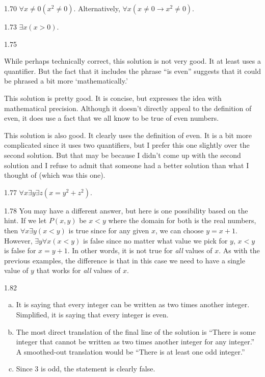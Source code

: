 \begin{Answer}{1.70}
$\forall x\neq 0 (x^2\neq 0)$.
Alternatively, $\forall x (x\neq 0 \rightarrow x^2\neq 0)$.
\end{Answer}
\begin{Answer}{1.73}
$\exists x (x>0)$.
\end{Answer}
\begin{Answer}{1.75}
\begin{solevalenum}
\item
While perhaps technically correct, this solution is not very good.  It at least uses a quantifier.
But the fact that it includes the phrase ``is even'' suggests that it could be phrased a bit more `mathematically.'
\item
This solution is pretty good.  It is concise, but expresses the idea with mathematical precision.
Although it doesn't directly appeal to the definition of even, it does use a fact that we all know to be
true of even numbers.
\item
This solution is also good.  It clearly uses the definition of even. It is a bit more complicated
since it uses two quantifiers, but I prefer this one slightly over the second solution.
But that may be because I didn't come up with the second solution and I refuse to admit that
someone had a better solution than what I thought of (which was this one).
\end{solevalenum}
\end{Answer}
\begin{Answer}{1.77}
$\forall x\exists y \exists z (x=y^2+z^2)$.
\end{Answer}
\begin{Answer}{1.78}
You may have a different answer, but here is one possibility based on the hint.
If we let $P(x,y)$ be $x<y$ where the domain for both is the real numbers, then
 $\forall x \exists y (x<y)$ is true since for any given $x$, we can choose $y=x+1$.
 However, $\exists y\forall x (x<y)$ is false since no matter what value we pick for $y$, $x<y$ is false for
 $x=y+1$.  In other words, it is not true for {\em all} values of $x$.
 As with the previous examples, the difference is that in this case we need to have a single value of $y$
 that works for {\em all} values of $x$.
\end{Answer}
\begin{Answer}{1.82}
\begin{enumerate}[(a)]
\item
It is saying that every integer can be written as two times another integer.
Simplified, it is saying that every integer is even.
\item
The most direct translation of the final line of the solution is ``There is some integer that cannot be
written as two times another integer for any integer.''  A smoothed-out translation would be ``There is at
least one odd integer.''
\item
Since $3$ is odd, the statement is clearly false.
\end{enumerate}
\end{Answer}

